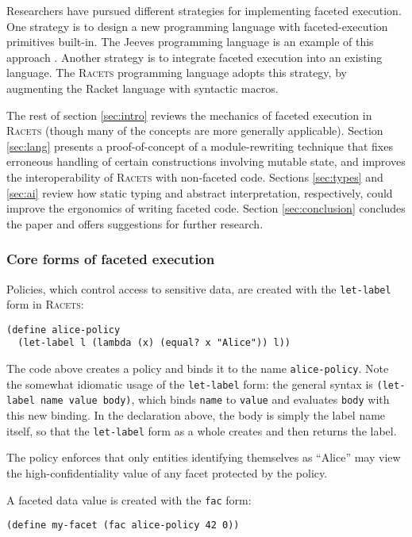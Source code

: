 \documentclass{article}
\begin{document}
Researchers have pursued different strategies for implementing faceted execution. One strategy is to design a new programming language with faceted-execution primitives built-in. The Jeeves programming language is an example of this approach \cite{jeeves}. Another strategy is to integrate faceted execution into an existing language. The \textsc{Racets} programming language \cite{racets} adopts this strategy, by augmenting the Racket language with syntactic macros.

The rest of section \ref{sec:intro} reviews the mechanics of faceted execution in \textsc{Racets} (though many of the concepts are more generally applicable). Section \ref{sec:lang} presents a proof-of-concept of a module-rewriting technique that fixes erroneous handling of certain constructions involving mutable state, and improves the interoperability of \textsc{Racets} with non-faceted code. Sections \ref{sec:types} and \ref{sec:ai} review how static typing and abstract interpretation, respectively, could improve the ergonomics of writing faceted code. Section \ref{sec:conclusion} concludes the paper and offers suggestions for further research.


\subsubsection{Core forms of faceted execution}
Policies, which control access to sensitive data, are created with the \texttt{let-label} form in \textsc{Racets}:

\begin{lstlisting}
(define alice-policy
  (let-label l (lambda (x) (equal? x "Alice")) l))
\end{lstlisting}

The code above creates a policy and binds it to the name \texttt{alice-policy}. Note the somewhat idiomatic usage of the \texttt{let-label} form: the general syntax is \texttt{(let-label name value body)}, which binds \texttt{name} to \texttt{value} and evaluates \texttt{body} with this new binding. In the declaration above, the body is simply the label name itself, so that the \texttt{let-label} form as a whole creates and then returns the label.

The policy enforces that only entities identifying themselves as ``Alice'' may view the high-confidentiality value of any facet protected by the policy.

A faceted data value is created with the \texttt{fac} form:

\begin{lstlisting}
(define my-facet (fac alice-policy 42 0))
\end{lstlisting}
\end{document}

